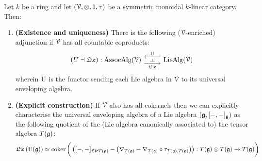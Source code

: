         \begin{theorem} \label{theorem: universal_enveloping_algebras_universal_property}
             Let $k$ be a ring and let $(\calV, \tensor, 1, \tau)$ be a symmetric monoidal $k$-linear category. Then:
                \begin{enumerate}
                    \item \textbf{(Existence and uniqueness)} There is the following ($\mathcal{V}$-enriched) adjunction if $\mathcal{V}$ has all countable coproducts:
                        $$
                            \begin{tikzcd}
                            	{(U \ladjoint \frakLie): \Assoc\Alg(\calV)} & {\Lie\Alg(\calV)}
                            	\arrow["{\frakLie}"{name=0, swap}, from=1-1, to=1-2, shift right=2]
                            	\arrow["{\U}"{name=1, swap}, from=1-2, to=1-1, shift right=2]
                            	\arrow["\dashv"{rotate=-90}, from=1, to=0, phantom]
                            \end{tikzcd}
                        $$
                    wherein $\mathrm{U}$ is the functor sending each Lie algebra in $\mathcal{V}$ to its universal enveloping algebra.
                    \item \textbf{(Explicit construction)} If $\mathcal{V}$ also has all cokernels then we can explicitly characterise the universal enveloping algebra of a Lie algebra $\left(\mathfrak{g}, [-,-]_{\mathfrak{g}}\right)$ as the following quotient of the (Lie algebra canonically associated to) the tensor algebra $T(\mathfrak{g})$:
                        $$\frakLie\left(\U(\g)\right) \cong \coker \bigg(\left([-,-]_{\frakLie T(\g)} - \left(\nabla_{T(\g)} - \nabla_{T(\g)} \circ \tau_{T(\g), T(\g)}\right)\right): T(\g) \tensor T(\g) \to T(\g)\bigg)$$
                \end{enumerate}
        \end{theorem}
